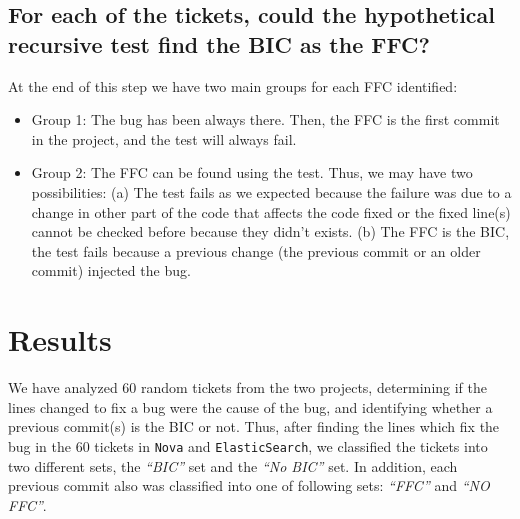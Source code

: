 \documentclass[conference]{IEEEtran}
\begin{document}
%


\subsection{For each of the tickets, could the hypothetical recursive test find the BIC as the FFC?}

At the end of this step we have two main groups for each FFC identified:
\begin{itemize}
	\item Group 1: The bug has been always there. Then, the FFC is the first commit in the project, and the test will always fail.
	\item Group 2: The FFC can be found using the test. Thus, we may have two possibilities: (a) The test fails as we expected because the failure was due to a change in other part of the code that affects the code fixed or the fixed line(s) cannot be checked before because they didn't exists. (b) The FFC is the BIC, the test fails because a previous change (the previous commit or an older commit) injected the bug.
\end{itemize}

\section{Results}
\label{sec:results}

We have analyzed 60 random tickets from the two projects, determining if the lines changed to fix a bug were the cause of the bug, and identifying whether a previous commit(s) is the BIC or not.
Thus, after finding the lines which fix the bug in the 60 tickets in \texttt{Nova} and \texttt{ElasticSearch}, we classified the tickets into two different sets, the \textit{``BIC''} set and the \textit{``No BIC''} set.
In addition, each previous commit also was classified into one of following sets: \textit{``FFC''} and \textit{``NO FFC''}.
\end{document}
